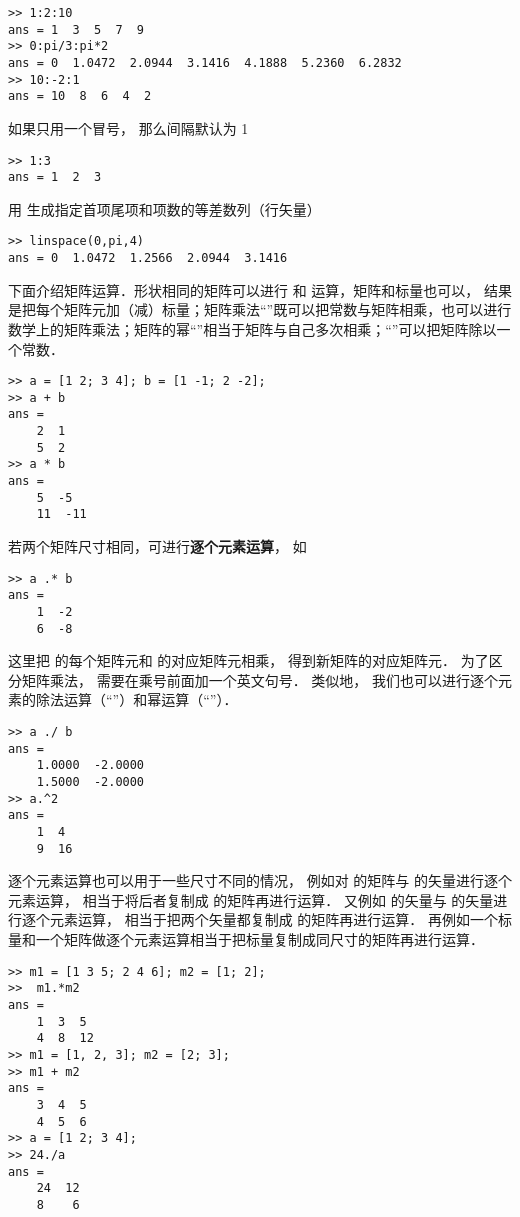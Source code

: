 \begin{lstlisting}[language=MatlabCom]
>> 1:2:10
ans = 1  3  5  7  9
>> 0:pi/3:pi*2
ans = 0  1.0472  2.0944  3.1416  4.1888  5.2360  6.2832
>> 10:-2:1
ans = 10  8  6  4  2
\end{lstlisting}
如果只用一个冒号， 那么间隔默认为 1
\begin{lstlisting}[language=MatlabCom]
>> 1:3
ans = 1  2  3
\end{lstlisting}
用  生成指定首项尾项和项数的等差数列（行矢量）
\begin{lstlisting}[language=MatlabCom]
>> linspace(0,pi,4)
ans = 0  1.0472  1.2566  2.0944  3.1416
\end{lstlisting}

下面介绍矩阵运算．形状相同的矩阵可以进行 \x{+} 和 \x{-} 运算，矩阵和标量也可以， 结果是把每个矩阵元加（减）标量；矩阵乘法“\x{*}”既可以把常数与矩阵相乘，也可以进行数学上的矩阵乘法；矩阵的幂“\x{\^{}}”相当于矩阵与自己多次相乘；“\x{/}”可以把矩阵除以一个常数．
\begin{lstlisting}[language=MatlabCom]
>> a = [1 2; 3 4]; b = [1 -1; 2 -2];
>> a + b
ans =
    2  1
    5  2
>> a * b
ans =
    5  -5
    11  -11
\end{lstlisting}
若两个矩阵尺寸相同，可进行\textbf{逐个元素运算}， 如
\begin{lstlisting}[language=MatlabCom]
>> a .* b
ans =
    1  -2
    6  -8
\end{lstlisting}
这里把  的每个矩阵元和  的对应矩阵元相乘， 得到新矩阵的对应矩阵元． 为了区分矩阵乘法， 需要在乘号前面加一个英文句号． 类似地， 我们也可以进行逐个元素的除法运算（“”）和幂运算（“”）．
\begin{lstlisting}[language=MatlabCom]
>> a ./ b
ans =
    1.0000  -2.0000
    1.5000  -2.0000
>> a.^2
ans =
    1  4
    9  16
\end{lstlisting}

逐个元素运算也可以用于一些尺寸不同的情况， 例如对  的矩阵与  的矢量进行逐个元素运算， 相当于将后者复制成  的矩阵再进行运算． 又例如  的矢量与  的矢量进行逐个元素运算， 相当于把两个矢量都复制成  的矩阵再进行运算． 再例如一个标量和一个矩阵做逐个元素运算相当于把标量复制成同尺寸的矩阵再进行运算．

\begin{lstlisting}[language=MatlabCom]
>> m1 = [1 3 5; 2 4 6]; m2 = [1; 2];
>>  m1.*m2
ans =
    1  3  5
    4  8  12
>> m1 = [1, 2, 3]; m2 = [2; 3];
>> m1 + m2
ans =
    3  4  5
    4  5  6
>> a = [1 2; 3 4];
>> 24./a
ans =
    24  12
    8    6
\end{lstlisting}

